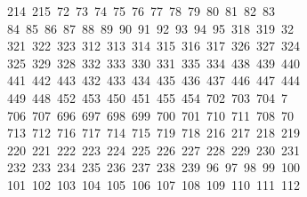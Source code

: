 \begin{tabbing}
\ 214\ 215\ 72\ 73\ 74\ 75\ 76\ 77\ 78\ 79\ 80\ 81\ 82\ 83\\[0pt]
\>\ 84\ 85\ 86\ 87\ 88\ 89\ 90\ 91\ 92\ 93\ 94\ 95\ 318\ 319\ 32\\[0pt]
\ 321\ 322\ 323\ 312\ 313\ 314\ 315\ 316\ 317\ 326\ 327\ 324\\[0pt]
\>\ 325\ 329\ 328\ 332\ 333\ 330\ 331\ 335\ 334\ 438\ 439\ 440\\[0pt]
\>\ 441\ 442\ 443\ 432\ 433\ 434\ 435\ 436\ 437\ 446\ 447\ 444\ \\[0pt]
\ 449\ 448\ 452\ 453\ 450\ 451\ 455\ 454\ 702\ 703\ 704\ 7\\[0pt]
\ 706\ 707\ 696\ 697\ 698\ 699\ 700\ 701\ 710\ 711\ 708\ 70\\[0pt]
\ 713\ 712\ 716\ 717\ 714\ 715\ 719\ 718\ 216\ 217\ 218\ 219\\[0pt]
\>\ 220\ 221\ 222\ 223\ 224\ 225\ 226\ 227\ 228\ 229\ 230\ 231\\[0pt]
\>\ 232\ 233\ 234\ 235\ 236\ 237\ 238\ 239\ 96\ 97\ 98\ 99\ 100\\[0pt]
\>\ 101\ 102\ 103\ 104\ 105\ 106\ 107\ 108\ 109\ 110\ 111\ 112\ \\[0pt]

\end{tabbing}
